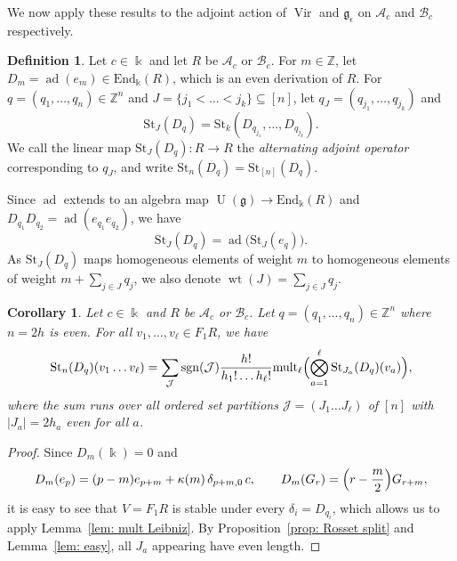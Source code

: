 \documentclass[12pt]{amsart}
\theoremstyle{plain}
\newtheorem{corollary}[theorem]{Corollary}
\theoremstyle{definition}
\newtheorem{definition}[theorem]{Definition}
\numberwithin{equation}{theorem}
\newcommand{\kk}{\Bbbk}
\newcommand{\Vir}{\operatorname{Vir}}
\newcommand{\UU}{\operatorname{U}}
\newcommand{\ad}{\operatorname{ad}}
\newcommand{\sgn}{\operatorname{sgn}}
\newcommand{\ZZ}{\mathbb{Z}}
\newcommand{\mc}[1]{\mathcal{#1}}
\newcommand{\calA}{\mathcal A}
\newcommand{\calB}{\mathcal B}
\newcommand{\g}{\mathfrak{g}}
\newcommand{\geps}{\mathfrak{g}_\epsilon}
\newcommand{\St}{\mathrm{St}}
\newcommand{\End}{\mathrm{End}}
\newcommand{\length}[1]{\left\lvert #1\right\rvert}
\newcommand{\mult}{\mathrm{mult}}
\newcommand{\wt}{\operatorname{wt}}
\begin{document}
We now apply these results to the adjoint action of $\Vir$ and $\geps$ on $\calA_c$ and $\calB_c$ respectively.

\begin{definition}\label{def: alternating adjoint operator}
Let $c \in \kk$ and let $R$ be $\calA_c$ or $\calB_c$. For $m \in \ZZ$, let $D_{m} = \ad(e_{m}) \in \End_\kk(R)$, which is an even derivation of $R$. For $q = (q_1, \dots, q_n) \in \ZZ^n$ and $J = \{j_1 < \dots < j_k\} \subseteq [n]$, let $q_J = (q_{j_1}, \dots, q_{j_k})$ and 
\[
\St_J(D_q) = \St_k(D_{q_{j_1}}, \dots, D_{q_{j_k}}).
\]
We call the linear map $\St_J(D_q): R \to R$ the \emph{alternating adjoint operator} corresponding to $q_J$, and write $\St_n(D_q) = \St_{[n]}(D_q)$. 
\end{definition}

Since $\ad$ extends to an algebra map $\UU(\g) \to \End_\kk(R)$ and $D_{q_1} D_{q_2} = \ad(e_{q_1} e_{q_2})$, we have
\begin{equation}\label{eq: St ad}
  \St_J(D_q) = \ad\big(\St_J(e_q)\big).
\end{equation}
As $\St_J(D_q)$ maps homogeneous elements of weight $m$ to homogeneous elements of weight $m+ \sum_{j \in J} q_j$, we also denote $\wt(J) = \sum_{j \in J} q_j$.

\begin{corollary}\label{cor: apply adjoint}
    Let $c \in \kk$ and $R$ be $\calA_c$ or $\calB_c$. Let $q = (q_1, \dots, q_n) \in \ZZ^n$ where $n=2h$ is even. For all $v_1, \dots, v_\ell \in F_1 R$, we have 
    \[\St_n(D_q) (v_1 \dots v_\ell) = \sum_{\mc{J}} \sgn(\mc{J}) \frac{h!}{h_1! \dots h_\ell!}  \mult _\ell 
    \Bigl(\bigotimes_{a=1}^{\ell}\St_{J_a}(D_q)(v_a)\Bigr),\]
    where the sum runs over all ordered set partitions $\mc{J}=(J_1 \dots J_\ell)$ of $[n]$ with $\length{J_a} = 2h_a$ even for all $a$. 
\end{corollary}
\begin{proof}
    Since $D_m(\kk) = 0$ and 
    \begin{align}
        D_{m}(e_p) = (p-m)e_{p+m} +  \kappa(m) \, \delta_{p+m, 0} \, c, \qquad D_m(G_r) = \Bigl(r - \frac{m}{2}\Bigr) G_{r+m},\label{eq: ad 1}
    \end{align}
    it is easy to see that $V = F_1 R$ is stable under every $\delta_i = D_{q_i}$, which allows us to apply Lemma~\ref{lem: mult Leibniz}. By Proposition~\ref{prop: Rosset split} and Lemma~\ref{lem: easy}, all $J_a$ appearing have even length.
\end{proof}
\end{document}
